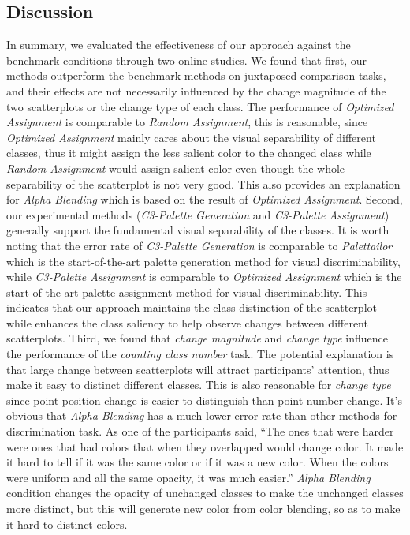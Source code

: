 \vspace{.3em}
\subsection{Discussion}
In summary, we evaluated the effectiveness of our approach against the benchmark conditions through two online studies.
We found that first, our methods outperform the benchmark methods on juxtaposed comparison tasks, and their effects are not necessarily influenced by the change magnitude of the two scatterplots or the change type of each class.
The performance of \emph{Optimized Assignment} is comparable to \emph{Random Assignment}, this is reasonable, since \emph{Optimized Assignment} mainly cares about the visual separability of different classes, thus it might assign the less salient color to the changed class while \emph{Random Assignment} would assign salient color even though the whole separability of the scatterplot is not very good. This also provides an explanation for \emph{Alpha Blending} which is based on the result of \emph{Optimized Assignment}.
Second, our experimental methods (\emph{C3-Palette Generation} and \emph{C3-Palette Assignment}) generally support the fundamental visual separability of the classes. It is worth noting that the error rate of \emph{C3-Palette Generation} is comparable to \emph{Palettailor} which is the start-of-the-art palette generation method for visual discriminability, while \emph{C3-Palette Assignment} is comparable to \emph{Optimized Assignment} which is the start-of-the-art palette assignment method for visual discriminability. This indicates that our approach maintains the class distinction of the scatterplot while enhances the class saliency to help observe changes between different scatterplots.
Third, we found that \emph{change magnitude} and \emph{change type} influence the performance of the \emph{counting class number} task. The potential explanation is that large change between scatterplots will attract participants' attention, thus make it easy to distinct different classes. This is also reasonable for \emph{change type} since point position change is easier to distinguish than point number change.
It's obvious that \emph{Alpha Blending} has a much lower error rate than other methods for discrimination task. As one of the participants said, ``The ones that were harder were ones that had colors that when they overlapped would change color. It made it hard to tell if it was the same color or if it was a new color. When the colors were uniform and all the same opacity, it was much easier.'' \emph{Alpha Blending} condition changes the opacity of unchanged classes to make the unchanged classes more distinct, but this will generate new color from color blending, so as to make it hard to distinct colors.

